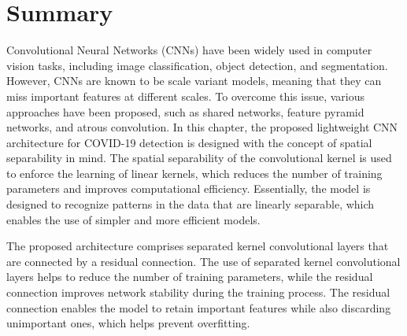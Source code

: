 \section{Summary}


Convolutional Neural Networks (CNNs) have been widely used in computer vision tasks, including image classification, object detection, and segmentation. However, CNNs are known to be scale variant models, meaning that they can miss important features at different scales. To overcome this issue, various approaches have been proposed, such as shared networks, feature pyramid networks, and atrous convolution.
In this chapter, the proposed lightweight CNN architecture for COVID-19 detection is designed with the concept of spatial separability in mind. The spatial separability of the convolutional kernel is used to enforce the learning of linear kernels, which reduces the number of training parameters and improves computational efficiency. Essentially, the model is designed to recognize patterns in the data that are linearly separable, which enables the use of simpler and more efficient models.

The proposed architecture comprises separated kernel convolutional layers that are connected by a residual connection. The use of separated kernel convolutional layers helps to reduce the number of training parameters, while the residual connection improves network stability during the training process. The residual connection enables the model to retain important features while also discarding unimportant ones, which helps prevent overfitting.

